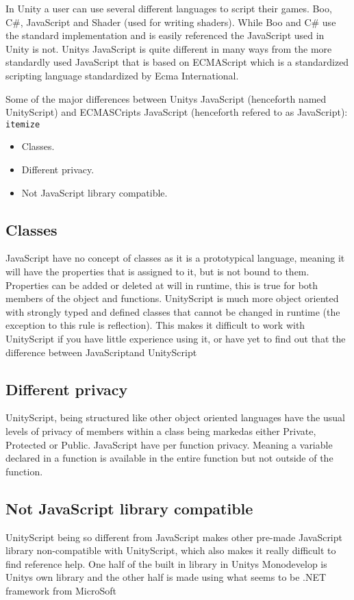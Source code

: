 In Unity a user can use several different languages to script their games. Boo, C\#, JavaScript and Shader (used for writing shaders).
While Boo and C\#  use the standard implementation and is easily referenced the JavaScript used in Unity is not.
Unitys JavaScript is quite different in many ways from the more standardly used JavaScript that is based on ECMAScript which is a standardized scripting
language standardized by Ecma International.

Some of the major differences between Unitys JavaScript (henceforth named UnityScript) and ECMASCripts JavaScript (henceforth refered to as JavaScript):
\texttt{itemize}
\begin{itemize}
	\item Classes.
	\item Different privacy.
	\item Not JavaScript library compatible.
\end{itemize}

\subsection {Classes}
JavaScript have no concept of classes as it is a prototypical language, meaning it will have the properties that is assigned to it, but is not bound to them.
Properties can be added or deleted at will in runtime, this is true for both members of the object and functions. UnityScript is much more object oriented with strongly typed and defined classes that cannot be changed in runtime (the exception to this rule is reflection).
This makes it difficult to work with UnityScript if you have little experience using it, or have yet to find out that the difference between JavaScriptand UnityScript



\subsection {Different privacy}
UnityScript, being structured like other object oriented languages have the usual levels of privacy of members within a class being markedas either Private, Protected or Public. JavaScript have per function privacy. Meaning a variable declared in a function is available in the entire function but not
outside of the function.

\subsection {Not JavaScript library compatible}
UnityScript being so different from JavaScript makes other pre-made JavaScript library non-compatible with UnityScript, which also makes it really difficult to find reference help. One half of the built in library in Unitys Monodevelop is Unitys own library and the other half is made using what seems to be .NET framework from MicroSoft

